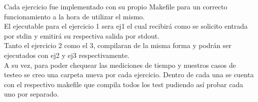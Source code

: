 Cada ejercicio fue implementado con su propio Makefile para un correcto funcionamiento a la hora de utilizar el mismo.\\
El ejecutable para el ejercicio 1 sera ej1 el cual recibir\'a como se solicito entrada por stdin y emitir\'a su respectiva salida por stdout.\\
Tanto el ejercicio 2 como el 3, compilaran de la misma forma y podr\'an ser ejecutados con ej2 y ej3 respectivamente.\\
A su vez, para poder chequear las mediciones de tiempo y nuestros casos de testeo se creo una carpeta nueva por cada ejercicio. Dentro de cada una se cuenta con el respectivo makefile que compila todos los test pudiendo as\'i probar cada uno por separado.